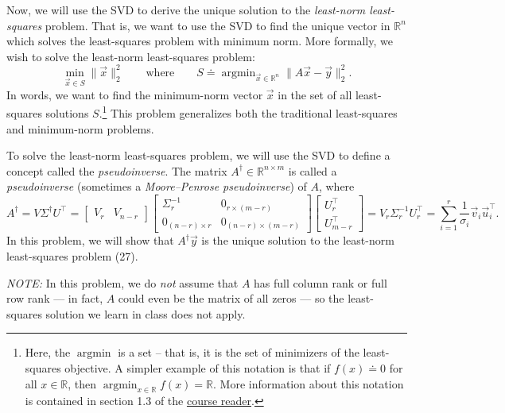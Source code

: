 \documentclass[10pt]{article}
\theoremstyle{definition}
\theoremstyle{plain}
\newcommand{\RR}{\mathbb{R}}
\DeclareMathOperator{\argmin}{argmin}
\begin{document}
Now, we will use the SVD to derive the unique solution to the \textit{least-norm least-squares} problem. That is, we want to use the SVD to find the unique vector in $\RR^n$ which solves the least-squares problem with minimum norm. More formally, we wish to solve the least-norm least-squares problem:
\begin{equation}
\min_{\vec{x} \in S} \|\vec{x}\|_2^2 \qquad \text{where} \qquad S \doteq \argmin_{\vec{x} \in \RR^n} \|A\vec{x} - \vec{y}\|_2^2.
\end{equation}
In words, we want to find the minimum-norm vector $\vec{x}$ in the set of all least-squares solutions $S$.\footnote{Here, the $\argmin$ is a set -- that is, it is the set of minimizers of the least-squares objective. A simpler example of this notation is that if $f(x) \doteq 0$ for all $x \in \RR$, then $\argmin_{x \in \RR} f(x) = \RR$. More information about this notation is contained in section 1.3 of the \href{https://eecs127.github.io/}{course reader}.} This problem generalizes both the traditional least-squares and minimum-norm problems.

To solve the least-norm least-squares problem, we will use the SVD to define a concept called the \textit{pseudoinverse}. The matrix $A^\dagger \in \RR^{n \times m}$ is called a \textit{pseudoinverse} (sometimes a \textit{Moore--Penrose pseudoinverse}) of $A$, where
\begin{equation}
A^\dagger = V\Sigma^\dagger U^\top = \begin{bmatrix} V_r & V_{n-r} \end{bmatrix}
\begin{bmatrix} \Sigma_r^{-1} & 0_{r \times (m-r)} \\ 0_{(n-r) \times r} & 0_{(n-r) \times (m-r)} \end{bmatrix}
\begin{bmatrix} U_r^\top \\ U_{m-r}^\top \end{bmatrix}
= V_r \Sigma_r^{-1} U_r^\top = \sum_{i=1}^{r} \frac{1}{\sigma_i} \vec{v}_i \vec{u}_i^\top.
\end{equation}
In this problem, we will show that $A^\dagger \vec{y}$ is the unique solution to the least-norm least-squares problem (27).

\textit{NOTE:} In this problem, we do \textit{not} assume that $A$ has full column rank or full row rank --- in fact, $A$ could even be the matrix of all zeros --- so the least-squares solution we learn in class does not apply.
\end{document}
